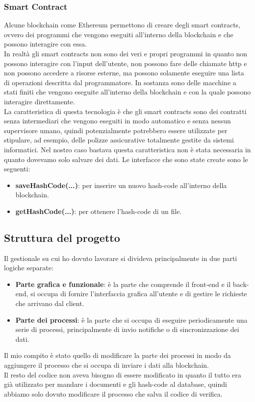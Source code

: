 \subsubsection{Smart Contract}
Alcune blockchain come Ethereum permettono di creare degli smart contracts,
ovvero dei programmi che vengono eseguiti all'interno della blockchain e che
possono interagire con essa. \\
In realtà gli smart contracts non sono dei veri e propri programmi in quanto
non possono interagire con l'input dell'utente, non possono fare delle chiamate
http e non possono accedere a risorse esterne, ma possono solamente eseguire
una lista di operazioni descritta dal programmatore. In sostanza sono delle
macchine a stati finiti che vengono eseguite all'interno della blockchain e con
la quale possono interagire direttamente. \\
La caratteristica di questa tecnologia è che gli smart contracts sono dei 
contratti senza intermediari che vengono eseguiti in modo automatico e senza 
nessun supervisore umano, quindi potenzialmente potrebbero essere utilizzate
per stipulare, ad esempio, delle polizze assicurative totalmente gestite
da sistemi informatici. Nel nostro caso bastava questa caratteristica non è
stata necessaria in quanto dovevamo solo salvare dei dati.
Le interfacce che sono state create sono le seguenti:
\begin{itemize}
    \item \textbf{saveHashCode(...)}: per inserire un nuovo hash-code
        all'interno della blockchain. 
    \item \textbf{getHashCode(...)}: per ottenere l'hash-code di un file.
\end{itemize}

\subsection{Struttura del progetto}
Il gestionale su cui ho dovuto lavorare si divideva principalmente in due parti
logiche separate:
\begin{itemize}
    \item \textbf{Parte grafica e funzionale}: è la parte che comprende il
        front-end e il back-end, si occupa di fornire l'interfaccia grafica
        all'utente e di gestire le richieste che arrivano dal client.
    \item \textbf{Parte dei processi}: è la parte che si occupa di eseguire
        periodicamente una serie di processi, principalmente di invio notifiche 
        o di sincronizzazione dei dati.
\end{itemize}
Il mio compito è stato quello di modificare la parte dei processi in modo da
aggiungere il processo che si occupa di inviare i dati alla blockchain. \\
Il resto del codice non aveva bisogno di essere modificato in quanto il tutto
era già utilizzato per mandare i documenti e gli hash-code al database, quindi
abbiamo solo dovuto modificare il processo che salva il codice di verifica.

